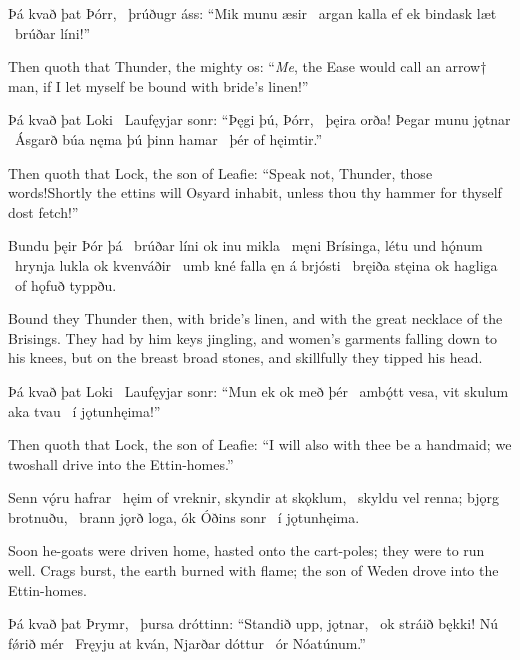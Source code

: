 Þá kvað þat Þórr, \hld\ þrúðugr áss:
“Mik munu æsir \hld\ argan kalla
ef ek bindask læt \hld\ brúðar líni!”

Then quoth that Thunder, the mighty os: “\emph{Me}, the Ease would call an arrow† man, if I let myself be bound with bride’s linen!”

Þá kvað þat Loki \hld\ Laufęyjar sonr:
“Þęgi þú, Þórr, \hld\ þęira orða!
Þegar munu jǫtnar \hld\ Ásgarð búa
nęma þú þinn hamar \hld\ þér of hęimtir.”

Then quoth that Lock, the son of Leafie: “Speak not, Thunder, those words!\footnotemark[1] Shortly the ettins will Osyard inhabit, unless thou thy hammer for thyself dost fetch!”

Bundu þęir Þór þá \hld\ brúðar líni
ok inu mikla \hld\ męni Brísinga,
létu und hǫ́num \hld\ hrynja lukla
ok kvenváðir \hld\ umb kné falla
ęn á brjósti \hld\ bręiða stęina
ok hagliga \hld\ of hǫfuð typpðu.

Bound they Thunder then, with bride’s linen, and with the great necklace of the Brisings. They had by him keys jingling, and women’s garments falling down to his knees, but on the breast broad stones, and skillfully they tipped his head.

Þá kvað þat Loki \hld\ Laufęyjar sonr:
“Mun ek ok með þér \hld\ ambǫ́tt vesa,
vit skulum aka tvau \hld\ í jǫtunhęima!”

Then quoth that Lock, the son of Leafie: “I will also with thee be a handmaid; we two\footnotemark[1] shall drive into the Ettin-homes.”

Senn vǫ́ru hafrar \hld\ hęim of vreknir,
skyndir at skǫklum, \hld\ skyldu vel renna;
bjǫrg brotnuðu, \hld\ brann jǫrð loga,
ók Óðins sonr \hld\ í jǫtunhęima.

Soon he-goats were driven home, hasted onto the cart-poles; they were to run well. Crags burst, the earth burned with flame; the son of Weden drove into the Ettin-homes.\footnotemark[1]

Þá kvað þat Þrymr, \hld\ þursa dróttinn:
“Standið upp, jǫtnar, \hld\ ok stráið bękki!
Nú fǿrið mér \hld\ Fręyju at kván,
Njarðar dóttur \hld\ ór Nóatúnum.”

